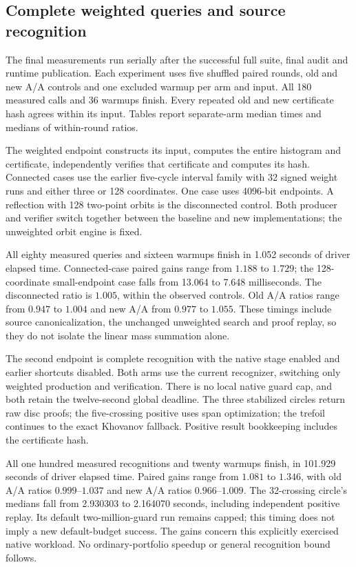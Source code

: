 \subsection{Complete weighted queries and source recognition}

The final measurements run serially after the successful full suite, final
audit and runtime publication. Each experiment uses five shuffled paired
rounds, old and new A/A controls and one excluded warmup per arm and input.
All 180 measured calls and 36 warmups finish. Every repeated old and new
certificate hash agrees within its input. Tables report separate-arm median
times and medians of within-round ratios.

The weighted endpoint constructs its input, computes the entire histogram
and certificate, independently verifies that certificate and computes its
hash. Connected cases use the earlier five-cycle interval family with 32
signed weight runs and either three or 128 coordinates. One case uses
4096-bit endpoints. A reflection with 128 two-point orbits is the
disconnected control. Both producer and verifier switch together between
the baseline and new implementations; the unweighted orbit engine is fixed.

\begin{center}
\small

\end{center}

All eighty measured queries and sixteen warmups finish in 1.052 seconds of
driver elapsed time. Connected-case paired gains range from $1.188$ to
$1.729$; the 128-coordinate small-endpoint case falls from 13.064 to
7.648 milliseconds. The disconnected ratio is $1.005$, within the observed
controls. Old A/A ratios range from $0.947$ to $1.004$ and new A/A from
$0.977$ to $1.055$. These timings include source canonicalization, the
unchanged unweighted search and proof replay, so they do not isolate the
linear mass summation alone.

The second endpoint is complete recognition with the native stage enabled
and earlier shortcuts disabled. Both arms use the current recognizer,
switching only weighted production and verification. There is no local
native guard cap, and both retain the twelve-second global deadline.
The three stabilized circles return raw disc proofs; the five-crossing
positive uses span optimization; the trefoil continues to the exact
Khovanov fallback. Positive result bookkeeping includes the certificate hash.

\begin{center}
\small

\end{center}

All one hundred measured recognitions and twenty warmups finish, in
101.929 seconds of driver elapsed time. Paired gains range from $1.081$
to $1.346$, with old A/A ratios $0.999$--$1.037$ and new A/A ratios
$0.966$--$1.009$. The 32-crossing circle's medians fall from 2.930303 to
2.164070 seconds, including independent positive replay. Its default
two-million-guard run remains capped; this timing does not imply a new
default-budget success. The gains concern this explicitly exercised native
workload. No ordinary-portfolio speedup or general recognition bound follows.

